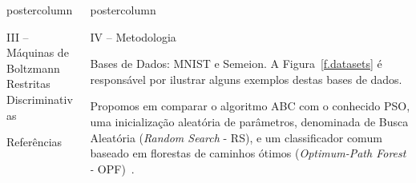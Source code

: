 \documentclass[final,hyperref={pdfpagelabels=false}]{beamer}
\newlength{\columnheight}
\begin{document}
\begin{frame}
\begin{columns}
\begin{column}{.45\textwidth}
\begin{beamercolorbox}[center,wd=\textwidth]{postercolumn}
\begin{minipage}[T]{.95\textwidth}
{\begin{block}{\vspace*{-7pt} III -- Máquinas de Boltzmann Restritas Discriminativas}
\begin{itemize}
        \end{itemize}
                   	
        \end{block}
        
        \begin{block}{\vspace*{-7pt} \large Referências}
		{\small
		
		}
		\end{block}
        

          }
        \end{minipage}
      \end{beamercolorbox}
    \end{column}

    \begin{column}{.54\textwidth}
      \begin{beamercolorbox}[center,wd=\textwidth]{postercolumn}
        \begin{minipage}[T]{.95\textwidth} %
          \parbox[t][\columnheight]{\textwidth}{ %
                  
        \begin{block}{\vspace*{-7pt} \large IV -- Metodologia}
			
			\begin{itemize}
			
			{\small \item Bases de Dados: MNIST e Semeion. A Figura~\ref{f.datasets} é responsável por ilustrar alguns exemplos destas bases de dados.
			
			\item Propomos em comparar o algoritmo ABC com o conhecido PSO, uma inicialização aleatória de parâmetros, denominada de Busca Aleatória (\emph{Random Search} - RS), e um classificador comum baseado em florestas de caminhos ótimos (\emph{Optimum-Path Forest} - OPF)~\cite{papa09}.} \hspace*{20cm}
				

\end{itemize}
\end{block}}
\end{minipage}
\end{beamercolorbox}
\end{column}
\end{columns}
\end{frame}
\end{document}
